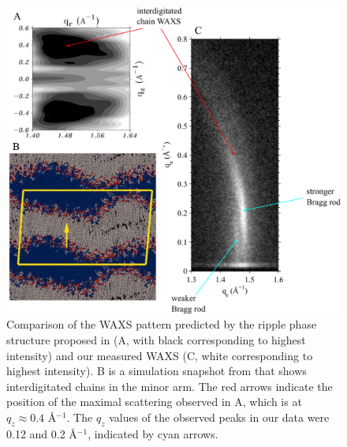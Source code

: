 \begin{figure}[htbp]
  \centering
  \includegraphics[width=\textwidth]{figures/ripple/discussion/ripple_waxs}
  \caption{Comparison of the WAXS pattern predicted by the 
  ripple phase structure proposed in \cite{ref:deVries05} 
  (A, with black corresponding to highest intensity) and
  our measured WAXS (C, white corresponding to highest intensity).
  B is a simulation snapshot from \cite{ref:deVries05} that shows 
  interdigitated chains in the minor arm.  
  The red arrows indicate the position of 
  the maximal scattering observed in A, which is at $q_z \approx 0.4$ \AA$^{-1}$.
  The $q_z$ values of the observed peaks in our data were 0.12
  and 0.2 \AA$^{-1}$, indicated by cyan arrows.}
  \label{fig:nGIWAXS_comparison}
\end{figure}

\newpage
